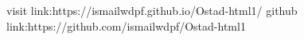 visit link:https://ismailwdpf.github.io/Ostad-html1/
github link:https://github.com/ismailwdpf/Ostad-html1
